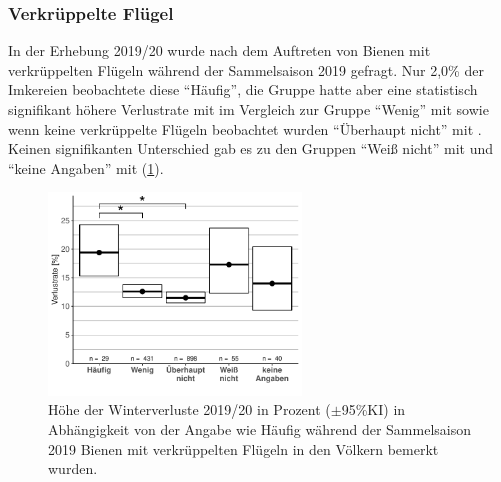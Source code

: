 \subsubsection{Verkrüppelte Flügel}
\label{ss:verkeuppelte_fluegel:U}

In der Erhebung 2019/20 wurde nach dem Auftreten von Bienen mit verkrüppelten Flügeln während der Sammelsaison 2019 gefragt. Nur 2,0\% der Imkereien beobachtete diese \enquote{Häufig}, die Gruppe hatte aber eine statistisch signifikant höhere Verlustrate mit  im Vergleich zur Gruppe \enquote{Wenig} mit  sowie wenn keine verkrüppelte Flügeln beobachtet wurden \enquote{Überhaupt nicht} mit . Keinen signifikanten Unterschied gab es zu den Gruppen \enquote{Weiß nicht} mit  und \enquote{keine Angaben} mit  (\cref{fig:u:queen:crippledbees}).

\begin{figure}[H]
  \centering
  \includegraphics[keepaspectratio,width=0.6\textwidth]{project-U-wintersterblichkeit/figures/plot_factor_crippledbees}
  \caption{Höhe der Winterverluste 2019/20 in Prozent ($\pm$95\%KI) in Abhängigkeit von der Angabe wie Häufig während der Sammelsaison 2019 Bienen mit verkrüppelten Flügeln in den Völkern bemerkt wurden.}
  \label{fig:u:queen:crippledbees}
\end{figure}
